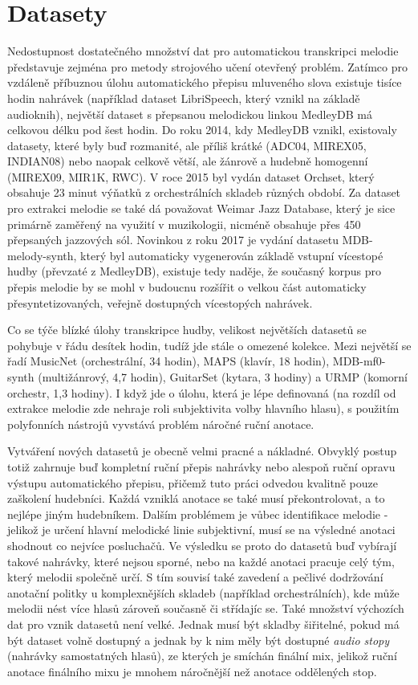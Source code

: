 \chapter{Datasety}

Nedostupnost dostatečného množství dat pro automatickou transkripci melodie představuje zejména pro metody strojového učení otevřený problém. Zatímco pro vzdáleně příbuznou úlohu automatického přepisu mluveného slova existuje tisíce hodin nahrávek (například dataset LibriSpeech, který vznikl na základě audioknih), největší dataset s přepsanou melodickou linkou MedleyDB má celkovou délku pod šest hodin. Do roku 2014, kdy MedleyDB vznikl, existovaly datasety, které byly buď rozmanité, ale příliš krátké (ADC04, MIREX05, INDIAN08) nebo naopak celkově větší, ale žánrově a hudebně homogenní (MIREX09, MIR1K, RWC). V roce 2015 byl vydán dataset Orchset, který obsahuje 23 minut výňatků z orchestrálních skladeb různých období. Za dataset pro extrakci melodie se také dá považovat Weimar Jazz Database, který je sice primárně zaměřený na využití v muzikologii, nicméně obsahuje přes 450 přepsaných jazzových sól. Novinkou z roku 2017 je vydání datasetu MDB-melody-synth, který byl automaticky vygenerován základě vstupní vícestopé hudby (převzaté z MedleyDB), existuje tedy naděje, že současný korpus pro přepis melodie by se mohl v budoucnu rozšířit o velkou část automaticky přesyntetizovaných, veřejně dostupných vícestopých nahrávek.

Co se týče blízké úlohy transkripce hudby, velikost největších datasetů se pohybuje v řádu desítek hodin, tudíž jde stále o omezené kolekce. Mezi největší se řadí MusicNet (orchestrální, 34 hodin), MAPS (klavír, 18 hodin), MDB-mf0-synth (multižánrový, 4,7 hodin), GuitarSet (kytara, 3 hodiny) a URMP (komorní orchestr, 1,3 hodiny). I když jde o úlohu, která je lépe definovaná (na rozdíl od extrakce melodie zde nehraje roli subjektivita volby hlavního hlasu), s použitím polyfonních nástrojů vyvstává problém náročné ruční anotace.

Vytváření nových datasetů je obecně velmi pracné a nákladné. Obvyklý postup totiž zahrnuje buď kompletní ruční přepis nahrávky nebo alespoň ruční opravu výstupu automatického přepisu, přičemž tuto práci odvedou kvalitně pouze zaškolení hudebníci. Každá vzniklá anotace se také musí překontrolovat, a to nejlépe jiným hudebníkem. Dalším problémem je vůbec identifikace melodie - jelikož je určení hlavní melodické linie subjektivní, musí se na výsledné anotaci shodnout co nejvíce posluchačů. Ve výsledku se proto do datasetů buď vybírají takové nahrávky, které nejsou sporné, nebo na každé anotaci pracuje celý tým, který melodii společně určí. S tím souvisí také zavedení a pečlivé dodržování anotační politky u komplexnějších skladeb (například orchestrálních), kde může melodii nést více hlasů zároveň současně či střídajíc se. Také množství výchozích dat pro vznik datasetů není velké. Jednak musí být skladby šiřitelné, pokud má být dataset volně dostupný a jednak by k nim měly být dostupné \emph{audio stopy} (nahrávky samostatných hlasů), ze kterých je smíchán finální mix, jelikož ruční anotace finálního mixu je mnohem náročnější než anotace oddělených stop.

